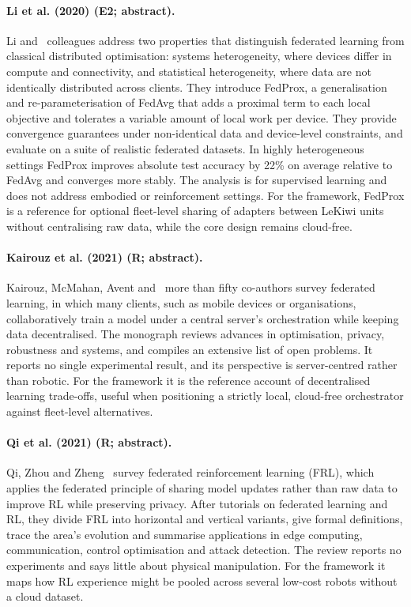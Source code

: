\documentclass[10pt,a4paper]{article}
\begin{document}
\paragraph{Li et al. (2020) (E2; abstract).} Li and~\cite{Li2020} colleagues address two properties that distinguish federated learning from classical distributed optimisation: systems heterogeneity, where devices differ in compute and connectivity, and statistical heterogeneity, where data are not identically distributed across clients. They introduce FedProx, a generalisation and re-parameterisation of FedAvg that adds a proximal term to each local objective and tolerates a variable amount of local work per device. They provide convergence guarantees under non-identical data and device-level constraints, and evaluate on a suite of realistic federated datasets. In highly heterogeneous settings FedProx improves absolute test accuracy by 22\% on average relative to FedAvg and converges more stably. The analysis is for supervised learning and does not address embodied or reinforcement settings. For the framework, FedProx is a reference for optional fleet-level sharing of adapters between LeKiwi units without centralising raw data, while the core design remains cloud-free.

\paragraph{Kairouz et al. (2021) (R; abstract).} Kairouz, McMahan, Avent and~\cite{Kairouz2021} more than fifty co-authors survey federated learning, in which many clients, such as mobile devices or organisations, collaboratively train a model under a central server's orchestration while keeping data decentralised. The monograph reviews advances in optimisation, privacy, robustness and systems, and compiles an extensive list of open problems. It reports no single experimental result, and its perspective is server-centred rather than robotic. For the framework it is the reference account of decentralised learning trade-offs, useful when positioning a strictly local, cloud-free orchestrator against fleet-level alternatives.

\paragraph{Qi et al. (2021) (R; abstract).} Qi, Zhou and Zheng~\cite{Qi2021} survey federated reinforcement learning (FRL), which applies the federated principle of sharing model updates rather than raw data to improve RL while preserving privacy. After tutorials on federated learning and RL, they divide FRL into horizontal and vertical variants, give formal definitions, trace the area's evolution and summarise applications in edge computing, communication, control optimisation and attack detection. The review reports no experiments and says little about physical manipulation. For the framework it maps how RL experience might be pooled across several low-cost robots without a cloud dataset.
\end{document}
